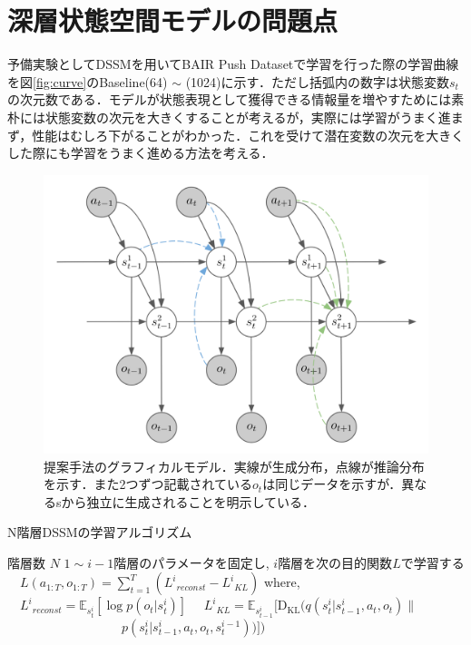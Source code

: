 \documentclass[10pt, twocolumn]{jarticle}
\begin{document}
\section{深層状態空間モデルの問題点}
予備実験としてDSSMを用いてBAIR Push Datasetで学習を行った際の学習曲線を図\ref{fig:curve}のBaseline(64) $\sim$ (1024)に示す．ただし括弧内の数字は状態変数$s_t$の次元数である．モデルが状態表現として獲得できる情報量を増やすためには素朴には状態変数の次元を大きくすることが考えるが，実際には学習がうまく進まず，性能はむしろ下がることがわかった．これを受けて潜在変数の次元を大きくした際にも学習をうまく進める方法を考える．

\begin{figure}[h]
  \begin{center}
    \includegraphics[width=\linewidth]{./figures/proposal_train.png}
    \caption[提案手法(二階層)のグラフィカルモデル]{\small 提案手法のグラフィカルモデル．実線が生成分布，点線が推論分布を示す．また2つずつ記載されている$o_t$は同じデータを示すが．異なるsから独立に生成されることを明示している．}
    \label{fig:proposal}
  \end{center}
\end{figure}

\begin{algorithm}[h]               
  \caption{\small N階層DSSMの学習アルゴリズム}
  \label{alg1}
  \begin{algorithmic}
    \REQUIRE \small 階層数 $N$ 
        \STATE \small $1 \sim i-1$階層のパラメータを固定し, 
        \STATE \small $i$階層を次の目的関数$L$で学習する
        \STATE $\hspace{1em} L(a_{1:T}, o_{1:T}) = \sum_{t=1}^T ( {L^i}_{reconst} - {L^i}_{KL}) $
        \STATE where, 
        \STATE $\hspace{1em} {L^i}_{reconst} = \mathbb{E}_{s^i_t} [\log p(o_t|s^i_t)]$
        \STATE $\hspace{1em} {L^i}_{KL} = \mathbb{E}_{s^i_{t-1}} [\mathrm{D_{KL}}(q(s^i_t|s^i_{t-1}, a_t, o_t) \| $
        \STATE $\hspace{9em} p(s^i_t|s^i_{t-1}, a_t, o_t, s^{i-1}_t))] )$
      \ENDWHILE
    \ENDFOR
  \end{algorithmic}
\end{algorithm}
\end{document}
